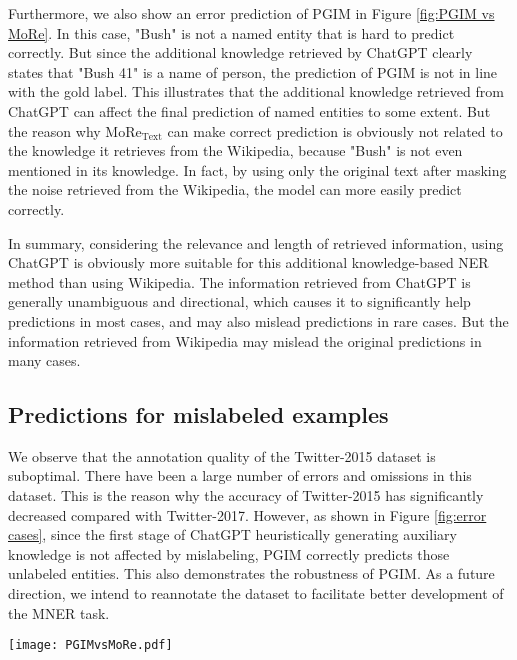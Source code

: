 \documentclass[11pt]{article}
\begin{document}
Furthermore, we also show an error prediction of PGIM in Figure \ref{fig:PGIM vs MoRe}. In this case, "Bush" is not a named entity that is hard to predict correctly. But since the additional knowledge retrieved by ChatGPT clearly states that "Bush 41" is a name of person, the prediction of PGIM is not in line with the gold label. This illustrates that the additional knowledge retrieved from ChatGPT can affect the final prediction of named entities to some extent. But the reason why MoRe$_{\text{Text}}$ can make correct prediction is obviously not related to the knowledge it retrieves from the Wikipedia, because "Bush" is not even mentioned in its knowledge. In fact, by using only the original text after masking the noise retrieved from the Wikipedia, the model can more easily predict correctly. 

In summary, considering the relevance and length of retrieved information, using ChatGPT is obviously more suitable for this additional knowledge-based NER method than using Wikipedia. 
The information retrieved from ChatGPT is generally unambiguous and directional, which causes it to significantly help predictions in most cases, and may also mislead predictions in rare cases. But the information retrieved from Wikipedia may mislead the original predictions in many cases.


\subsection{Predictions for mislabeled examples}
\label{misableled}
We observe that the annotation quality of the Twitter-2015 dataset is suboptimal. There have been a large number of errors and omissions in this dataset. This is the reason why the accuracy of Twitter-2015 has significantly decreased compared with Twitter-2017. However, as shown in Figure \ref{fig:error cases},  since the first stage of ChatGPT heuristically generating auxiliary knowledge is not affected by mislabeling, PGIM correctly predicts those unlabeled entities. This also demonstrates the robustness of PGIM. 
As a future direction, we intend to reannotate the dataset to facilitate better development of the MNER task. 

\begin{figure*}
	\centering
	\texttt{[image: PGIMvsMoRe.pdf]}
	\caption{Two case studies on how information retrieved from Wikipedia by MoRe and information retrieved by PGIM from ChatGPT affects model predictions.}
	\label{fig:PGIM vs MoRe}
\end{figure*}
\end{document}
